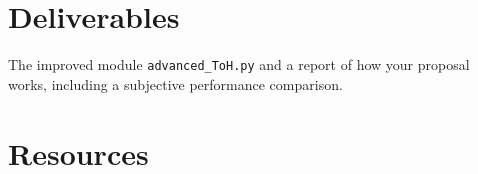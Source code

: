 \begin{comment}
\subsection{Subjective performance}

\begin{enumerate}
\item Using a recording tool such as
  \href{http://audacity.sourceforge.net}{Audacity} or
  \href{http://plugin.org.uk/timemachine/}{JACK Timemachine}, record
  the simulated transmission of a piece of audio and create a
  \texttt{.wav} file, when the audio has been transmitted using
  \texttt{temporal\_overlapped\_DWT\_coding.py} and
  \texttt{threshold.py}, using in both cases the same transmission
  bit-rate. Vary the quantization step size for controlling the
  bit-rate.
\item Determine which audio sounds better from a subjective point of
  view. Repeat this step the number of times you consider necessary.
\end{enumerate}
\end{comment}

\section{Deliverables}

The improved module \verb|advanced_ToH.py| and a report of how your proposal works,
including a subjective performance comparison.

\section{Resources}



